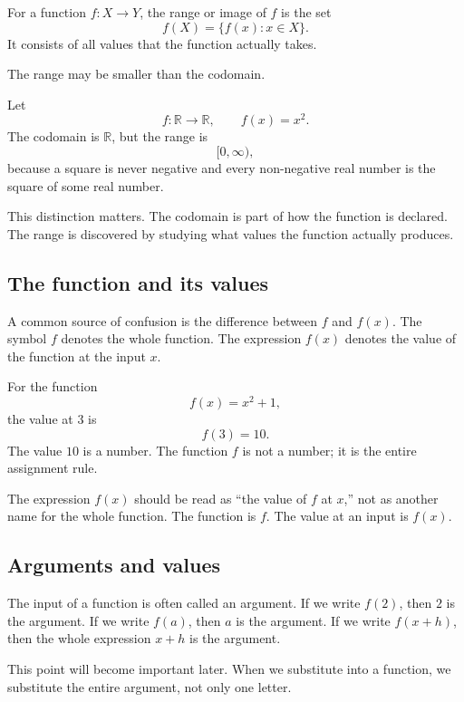 \begin{definitionbox}
For a function \(f:X\to Y\), the range or image of \(f\) is the set
\[
f(X)=\{f(x):x\in X\}.
\]
It consists of all values that the function actually takes.
\end{definitionbox}

The range may be smaller than the codomain.

\begin{examplebox}
Let
\[
f:\mathbb{R}\to\mathbb{R},
\qquad
f(x)=x^2.
\]
The codomain is \(\mathbb{R}\), but the range is
\[
[0,\infty),
\]
because a square is never negative and every non-negative real number is the square of some real number.
\end{examplebox}

This distinction matters. The codomain is part of how the function is declared. The range is discovered by studying what values the function actually produces.

\subsection*{The function and its values}

A common source of confusion is the difference between \(f\) and \(f(x)\). The symbol \(f\) denotes the whole function. The expression \(f(x)\) denotes the value of the function at the input \(x\).

For the function
\[
f(x)=x^2+1,
\]
the value at \(3\) is
\[
f(3)=10.
\]
The value \(10\) is a number. The function \(f\) is not a number; it is the entire assignment rule.

\begin{remarkbox}
The expression \(f(x)\) should be read as ``the value of \(f\) at \(x\),'' not as another name for the whole function. The function is \(f\). The value at an input is \(f(x)\).
\end{remarkbox}

\subsection*{Arguments and values}

The input of a function is often called an argument. If we write \(f(2)\), then \(2\) is the argument. If we write \(f(a)\), then \(a\) is the argument. If we write \(f(x+h)\), then the whole expression \(x+h\) is the argument.

This point will become important later. When we substitute into a function, we substitute the entire argument, not only one letter.

